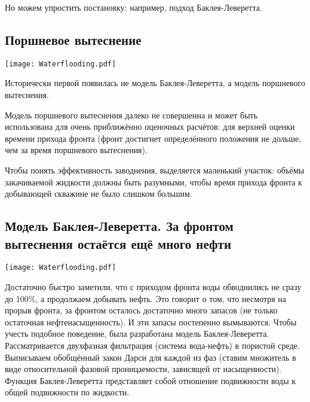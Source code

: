 \documentclass[main.tex]{subfiles}
\begin{document}
Но можем упростить постановку: например, подход Баклея-Леверетта.

\subsection{Поршневое вытеснение}

\texttt{[image: Waterflooding.pdf]}

Исторически первой появилась не модель Баклея-Леверетта, а модель поршневого вытеснения.

Модель поршневого вытеснения далеко не совершенна и может быть использована для очень приближённо оценочных расчётов: для верхней оценки времени прихода фронта (фронт достигнет определённого положения не дольше, чем за время поршневого вытеснения).

Чтобы понять эффективность заводнения, выделяется маленький участок: объёмы закачиваемой жидкости должны быть разумными, чтобы время прихода фронта к добывающей скважине не было слишком большим.


\subsection{Модель Баклея-Леверетта. За фронтом вытеснения остаётся ещё много нефти}

\texttt{[image: Waterflooding.pdf]}

Достаточно быстро заметили, что с приходом фронта воды обводнились не сразу до 100\%, а продолжаем добывать нефть. Это говорит о том, что несмотря на прорыв фронта, за фронтом осталось достаточно много запасов (не только остаточная нефтенасыщенность). И эти запасы постепенно вымываются. Чтобы учесть подобное поведение, была разработана модель Баклея-Леверетта.\\

Рассматривается двухфазная фильтрация (система вода-нефть) в пористой среде. Выписываем обобщённый закон Дарси для каждой из фаз (ставим множитель в виде относительной фазовой проницаемости, зависящей от насыщенности).\\

Функция Баклея-Леверетта представляет собой отношение подвижности воды к общей подвижности по жидкости.\\
\end{document}

